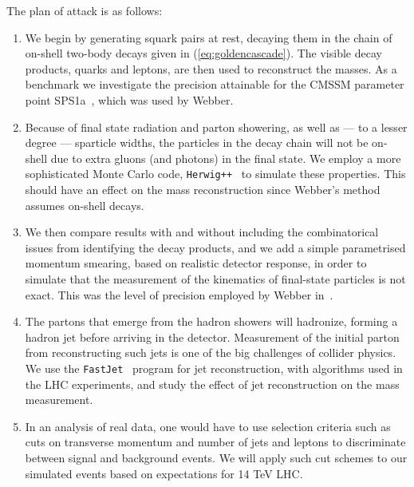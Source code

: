 \documentclass[twoside,english]{uiofysmaster}
\begin{document}
The plan of attack is as follows:
\begin{enumerate}
	\item We begin by generating squark pairs at rest, decaying them in the chain of on-shell two-body decays given in (\ref{eq:goldencascade}). The visible decay products, quarks and leptons, are then used to reconstruct the masses. As a benchmark we investigate the precision attainable for the CMSSM parameter point SPS1a~\cite{Allanach:2002nj}, which was used by Webber. 
	\item Because of final state radiation and parton showering, as well as --- to a lesser degree --- sparticle widths, the particles in the decay chain will not be on-shell due to extra gluons (and photons) in the final state. We employ a more sophisticated Monte Carlo code, {\tt Herwig++}~\cite{Bahr:2008pv}  to simulate these properties. This should have an effect on the mass reconstruction since Webber's method assumes on-shell decays.
	\item	We then compare results with and without including the combinatorical issues from identifying the decay products, and we add a simple parametrised momentum smearing, based on realistic detector response, in order to simulate that the measurement of the kinematics of final-state particles is not exact. This was the level of precision employed by Webber in~\cite{Webber:2009vm}.
	\item The partons that emerge from the hadron showers will hadronize, forming a hadron jet before arriving in the detector. Measurement of the initial parton from reconstructing such jets is one of the big challenges of collider physics. We use the {\tt FastJet}~\cite{Cacciari:2011ma} program for jet reconstruction, with algorithms used in the LHC experiments, and study the effect of jet reconstruction on the mass measurement.
	\item In an analysis of real data, one would have to use selection criteria such as cuts on transverse momentum and number of jets and leptons to discriminate between signal and background events. We will apply such cut schemes to our simulated events based on expectations for 14 TeV LHC. 

\end{enumerate}
\end{document}
